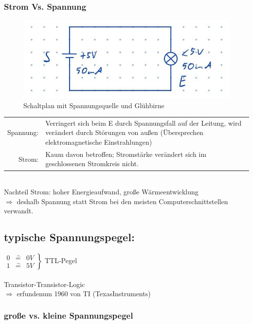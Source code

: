 \documentclass[10pt,a4paper]{scrartcl}
\begin{document}
\subsubsection*{Strom Vs. Spannung}
\begin{figure}
	\centering
	\includegraphics[width=0.5\linewidth]{img/strom_spannung_signale}
	\caption{Schaltplan mit Spannungsquelle und Glühbirne}
	\label{abb:schaltplan}
\end{figure}

\begin{tabularx}{\linewidth}{r X}
	Spannung: & Verringert sich beim E durch Spannungsfall auf der Leitung, wird verändert durch Störungen von außen (\glqq Übersprechen\grqq\, elektromagnetische Einstrahlungen)\\
	Strom: & Kaum davon betroffen; Stromstärke verändert sich im geschlossenen Stromkreis nicht.\\
\end{tabularx}
\\
Nachteil Strom: hoher Energieaufwand, große Wärmeentwicklung\\
\hspace*{2em}$\Rightarrow$ deshalb Spannung statt Strom bei den meisten Computerschnittstellen verwandt.
\\

\subsection*{typische Spannungspegel:}
\hspace*{3em}
$ \left.  \begin{array}{ccc}
0 & \hat{=} & 0V \\
1 & \hat{=} & 5V
\end{array} \right\rbrace 
$ TTL-Pegel
\\\\
\glqq Transistor-Transistor-Logic\grqq \\
\hspace*{2em} $\Rightarrow$ \glqq erfunden\grqq um 1960 von TI (TexasInstruments)

\subsubsection*{große vs. kleine Spannungspegel}
\end{document}
